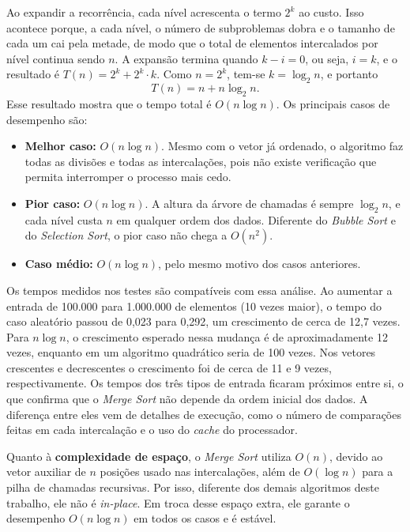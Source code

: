 \qquad Ao expandir a recorrência, cada nível acrescenta o termo $2^k$ ao custo. Isso acontece porque, a cada nível, o número de subproblemas dobra e o tamanho de cada um cai pela metade, de modo que o total de elementos intercalados por nível continua sendo $n$. A expansão termina quando $k - i = 0$, ou seja, $i = k$, e o resultado é $T(n) = 2^k + 2^k \cdot k$. Como $n = 2^k$, tem-se $k = \log_2 n$, e portanto
\[
T(n) = n + n \log_2 n .
\]
Esse resultado mostra que o tempo total é $O(n \log n)$. Os principais casos de desempenho são:
\begin{itemize}
    \item \textbf{Melhor caso:} $O(n \log n)$. Mesmo com o vetor já ordenado, o algoritmo faz todas as divisões e todas as intercalações, pois não existe verificação que permita interromper o processo mais cedo.

    \item \textbf{Pior caso:} $O(n \log n)$. A altura da árvore de chamadas é sempre $\log_2 n$, e cada nível custa $n$ em qualquer ordem dos dados. Diferente do \textit{Bubble Sort} e do \textit{Selection Sort}, o pior caso não chega a $O(n^2)$.

    \item \textbf{Caso médio:} $O(n \log n)$, pelo mesmo motivo dos casos anteriores.
\end{itemize}

\qquad Os tempos medidos nos testes são compatíveis com essa análise. Ao aumentar a entrada de 100.000 para 1.000.000 de elementos (10 vezes maior), o tempo do caso aleatório passou de 0,023 para 0,292, um crescimento de cerca de 12,7 vezes. Para $n \log n$, o crescimento esperado nessa mudança é de aproximadamente 12 vezes, enquanto em um algoritmo quadrático seria de 100 vezes. Nos vetores crescentes e decrescentes o crescimento foi de cerca de 11 e 9 vezes, respectivamente. Os tempos dos três tipos de entrada ficaram próximos entre si, o que confirma que o \textit{Merge Sort} não depende da ordem inicial dos dados. A diferença entre eles vem de detalhes de execução, como o número de comparações feitas em cada intercalação e o uso do \textit{cache} do processador.

\qquad Quanto à \textbf{complexidade de espaço}, o \textit{Merge Sort} utiliza $O(n)$, devido ao vetor auxiliar de $n$ posições usado nas intercalações, além de $O(\log n)$ para a pilha de chamadas recursivas. Por isso, diferente dos demais algoritmos deste trabalho, ele não é \textit{in-place}. Em troca desse espaço extra, ele garante o desempenho $O(n \log n)$ em todos os casos e é estável.